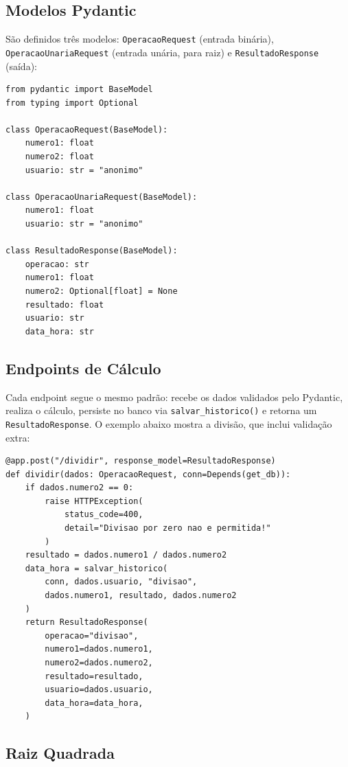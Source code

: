 \documentclass[12pt, a4paper]{article}
\begin{document}
\subsection{Modelos Pydantic}

São definidos três modelos: \texttt{OperacaoRequest} (entrada binária), \texttt{OperacaoUnariaRequest} (entrada unária, para raiz) e \texttt{ResultadoResponse} (saída):

\begin{lstlisting}[caption={Modelos Pydantic de entrada e saída}]
from pydantic import BaseModel
from typing import Optional

class OperacaoRequest(BaseModel):
    numero1: float
    numero2: float
    usuario: str = "anonimo"

class OperacaoUnariaRequest(BaseModel):
    numero1: float
    usuario: str = "anonimo"

class ResultadoResponse(BaseModel):
    operacao: str
    numero1: float
    numero2: Optional[float] = None
    resultado: float
    usuario: str
    data_hora: str
\end{lstlisting}

\subsection{Endpoints de Cálculo}

Cada endpoint segue o mesmo padrão: recebe os dados validados pelo Pydantic, realiza o cálculo, persiste no banco via \texttt{salvar\_historico()} e retorna um \texttt{ResultadoResponse}. O exemplo abaixo mostra a divisão, que inclui validação extra:

\begin{lstlisting}[caption={Endpoint de divisão com tratamento de erro}]
@app.post("/dividir", response_model=ResultadoResponse)
def dividir(dados: OperacaoRequest, conn=Depends(get_db)):
    if dados.numero2 == 0:
        raise HTTPException(
            status_code=400,
            detail="Divisao por zero nao e permitida!"
        )
    resultado = dados.numero1 / dados.numero2
    data_hora = salvar_historico(
        conn, dados.usuario, "divisao",
        dados.numero1, resultado, dados.numero2
    )
    return ResultadoResponse(
        operacao="divisao",
        numero1=dados.numero1,
        numero2=dados.numero2,
        resultado=resultado,
        usuario=dados.usuario,
        data_hora=data_hora,
    )
\end{lstlisting}

\subsection{Raiz Quadrada}
\end{document}
